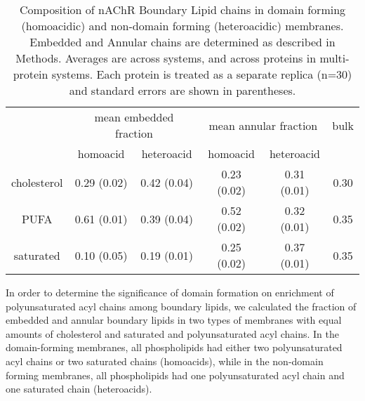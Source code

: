 \begin{table}[htbp]
  \centering
  \begin{tabular}{@{} c|cc|cc|c @{}}
     &\multicolumn{2}{c|}{mean embedded fraction}  &\multicolumn{2}{c|}{mean annular fraction} &bulk  \\ 
     & homoacid & heteroacid & homoacid & heteroacid  & \\ 
    \hline
    cholesterol & 0.29 (0.02)  & 0.42 (0.04) &0.23 (0.02)& 0.31 (0.01)& 0.30  \\ 
    PUFA  &0.61 (0.01)& 0.39 (0.04) & 0.52 (0.02) & 0.32 (0.01)&0.35\\ 
    saturated & 0.10 (0.05) & 0.19 (0.01) & 0.25 (0.02) & 0.37  (0.01)&0.35 \\ 
    \hline
  \end{tabular}
  \caption{Composition of nAChR Boundary Lipid chains in domain forming (homoacidic) and non-domain forming (heteroacidic) membranes.  Embedded and Annular chains are determined as described in Methods.  Averages are across systems, and across proteins in multi-protein systems.  Each protein is treated as a separate replica (n=30) and standard errors are shown in parentheses.  }
  \label{tab:bound}
\end{table}
     
%
%
%
%


In order to determine the significance of domain formation on enrichment of polyunsaturated acyl chains among boundary lipids, we calculated the fraction of embedded and annular boundary lipids in two types of membranes with equal amounts of cholesterol and saturated and polyunsaturated acyl chains.  In the domain-forming membranes, all phospholipids had either two polyunsaturated acyl chains or two saturated chains (homoacids), while in the non-domain forming membranes, all phospholipids had one polyunsaturated acyl chain and one saturated chain (heteroacids).  %

